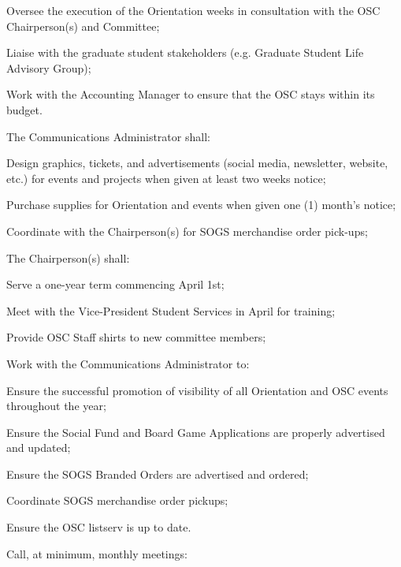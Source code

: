 \begin{longenum}[ label*=\thesubsection.\arabic*., align=left]
\begin{longenum}[label*=\arabic*., align=left]
\begin{longenum}[label*=\arabic*., align=left]
			\item Oversee the execution of the Orientation weeks in consultation with the OSC Chairperson(s) and Committee;			
			\item Liaise with the graduate student stakeholders (e.g. Graduate Student Life Advisory Group);
			\item Work with the Accounting Manager to ensure that the OSC stays within its budget.
			\end{longenum}
		\item The Communications Administrator shall:		
			\begin{longenum}[label*=\arabic*., align=left]
			\item Design graphics, tickets, and advertisements (social media, newsletter, website, etc.) for events and projects when given at least two weeks notice;
			\item Purchase supplies for Orientation and events when given one (1) month's notice;
			\item Coordinate with the Chairperson(s) for SOGS merchandise order pick-ups;
			\end{longenum}			
		\item The Chairperson(s) shall:
			\begin{longenum}[label*=\arabic*., align=left]
			\item Serve a one-year term commencing April 1st;
			\item Meet with the Vice-President Student Services in April for training;
			\item Provide OSC Staff shirts to new committee members;
			\item Work with the Communications Administrator to:
				\begin{longenum}[label*=\arabic*., align=left]			
				\item Ensure the successful promotion of visibility of all Orientation and OSC events throughout the year;
				\item Ensure the Social Fund and Board Game Applications are properly advertised and updated;
				\item Ensure the SOGS Branded Orders are advertised and ordered;
				\item Coordinate SOGS merchandise order pickups;
				\item Ensure the OSC listserv is up to date.												
				\end{longenum}				
			\item Call, at minimum, monthly meetings:
				\begin{longenum}[label*=\arabic*., align=left]

\end{longenum}
\end{longenum}
\end{longenum}
\end{longenum}
